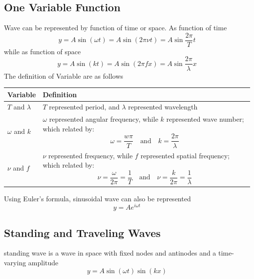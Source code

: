 \documentclass[../main.tex]{subfiles}
\begin{document}
\subsection*{One Variable Function}
Wave can be represented by function of time or space. As function of time
\begin{equation*}
    y = A \sin(\omega t) = A \sin(2\pi \nu t) =A\sin \frac{2\pi}{T}t
\end{equation*}
while as function of space
\begin{equation*}
    y = A \sin(k t) = A \sin(2\pi f x) =A\sin \frac{2\pi}{\lambda}x
\end{equation*}
The definition of Variable are as follows
\begin{center}
    \begin{longtable}{| p{} | p{} |}
        \hline Variable&Definition\\\hline\hline
        $T$ and $\lambda$&$T$ represented period, and $\lambda$ represented wavelength\\\hline
        $\omega$ and $k$&$\omega$ represented angular frequency, while $k$ represented wave number; which related by:\begin{equation*}
            \omega=\frac{w\pi}{T}\quad\text{and}\quad k=\frac{2\pi}{\lambda}
        \end{equation*}\\\hline
        $\nu$ and $f$&$\nu$ represented frequency, while $f$ represented spatial frequency; which related by:\begin{equation*}
            \nu=\frac{\omega}{2\pi}=\frac{1}{T}\quad 
            \text{and}
            \quad \nu=\frac{k}{2\pi}=\frac{1}{\lambda}
        \end{equation*}\\\hline
    \end{longtable}
\end{center}

Using Euler's formula, sinusoidal wave can also be represented
\begin{equation*}
    y=Ae^{i\omega t}
\end{equation*}

\subsection*{Standing and Traveling Waves}
standing wave is a wave in space with fixed nodes and antinodes and a time-varying amplitude
\begin{equation*}
    y = A \sin(\omega t) \sin(kx)
\end{equation*}
\end{document}
